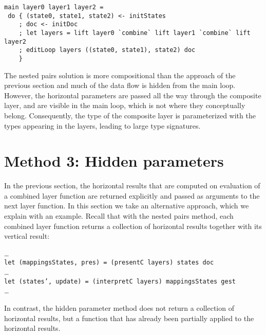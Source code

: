 \documentclass[preprint,natbib]{sigplanconf}
\begin{document}
\begin{small}
\begin{verbatim}
main layer0 layer1 layer2 = 
 do { (state0, state1, state2) <- initStates
    ; doc <- initDoc 
    ; let layers = lift layer0 `combine` lift layer1 `combine` lift  layer2
    ; editLoop layers ((state0, state1), state2) doc
    }
\end{verbatim}
\end{small}



The nested pairs solution is more compositional than the approach of the previous section and much of the data flow is hidden from the main loop. However, the horizontal parameters are passed all the way through the composite layer, and are visible in the main loop, which is not where they conceptually belong. Consequently, the type of the composite layer is parameterized with the types appearing in the layers, leading to large type signatures.



%																
%																
%																
\section{Method 3: Hidden parameters} \label{sect:hidden}

 
In the previous section, the horizontal results that are computed on evaluation of a combined layer function are returned explicitly and passed as arguments to the next layer function. In this section we take an alternative approach, which we explain with an example.  Recall that with the nested pairs method, each combined layer function returns a collection of horizontal results together with its vertical result:

\dots\\
{\tt  let (mappingsStates, pres) = (presentC layers) states doc }\\
\dots\\
{\tt let (states', update) = (interpretC layers) mappingsStates gest}\\
\dots

In contrast, the hidden parameter method does not return a collection of horizontal results, but a function that has already been partially applied to the horizontal results.
\end{document}

